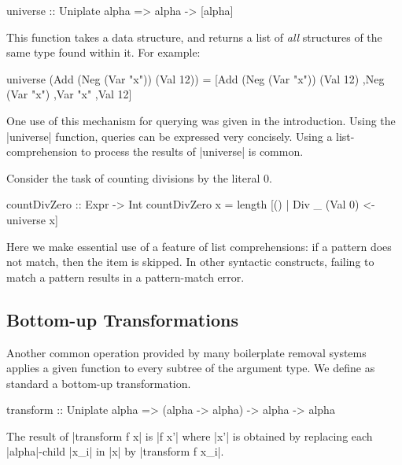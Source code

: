 \begin{code}
universe :: Uniplate alpha => alpha -> [alpha]
\end{code}

This function takes a data structure, and returns a list of \textit{all} structures of the same type found within it. For example:

\begin{code}
universe (Add (Neg (Var "x")) (Val 12)) =
    [Add (Neg (Var "x")) (Val 12)
    ,Neg (Var "x")
    ,Var "x"
    ,Val 12]
\end{code}

One use of this mechanism for querying was given in the introduction. Using the |universe| function, queries can be expressed very concisely. Using a list-comprehension to process the results of |universe| is common.

\begin{example}
\label{exU:zerocount}
Consider the task of counting divisions by the literal 0.

\begin{code}
countDivZero :: Expr -> Int
countDivZero x = length [() | Div _ (Val 0) <- universe x]
\end{code}

Here we make essential use of a feature of list comprehensions: if a pattern does not match, then the item is skipped. In other syntactic constructs, failing to match a pattern results in a pattern-match error.
\end{example}

\subsection{Bottom-up Transformations}

Another common operation provided by many boilerplate removal systems \citep{lammel:syb,stratego,strafunski,ren:generic_recursion_toolbox} applies a given function to every subtree of the argument type. We define as standard a bottom-up transformation.

\begin{code}
transform :: Uniplate alpha => (alpha -> alpha) -> alpha -> alpha
\end{code}

The result of |transform f x| is |f x'| where |x'| is obtained by replacing each |alpha|-child |x_i| in |x| by |transform f x_i|.

